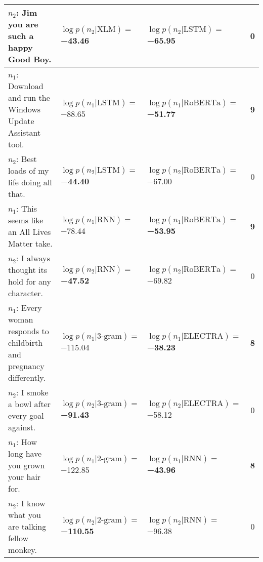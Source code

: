 \begin{tabularx}{\textwidth}{lllc}
                            $n_2$: Jim you are such a happy Good Boy. &      $\log p(n_2 | \textrm{XLM})=$\textbf{\num{-43.46}} &              $\log p(n_2 | \textrm{LSTM})=$\num{-65.95} &            \num{0} \\\midrule
           $n_1$: Download and run the Windows Update Assistant tool. &              $\log p(n_1 | \textrm{LSTM})=$\num{-88.65} &  $\log p(n_1 | \textrm{RoBERTa})=$\textbf{\num{-51.77}} &   \textbf{\num{9}} \\
                         $n_2$: Best loads of my life doing all that. &     $\log p(n_2 | \textrm{LSTM})=$\textbf{\num{-44.40}} &           $\log p(n_2 | \textrm{RoBERTa})=$\num{-67.00} &            \num{0} \\\midrule
                     $n_1$: This seems like an All Lives Matter take. &               $\log p(n_1 | \textrm{RNN})=$\num{-78.44} &  $\log p(n_1 | \textrm{RoBERTa})=$\textbf{\num{-53.95}} &   \textbf{\num{9}} \\
                  $n_2$: I always thought its hold for any character. &      $\log p(n_2 | \textrm{RNN})=$\textbf{\num{-47.52}} &           $\log p(n_2 | \textrm{RoBERTa})=$\num{-69.82} &            \num{0} \\\midrule
 $n_1$: Every woman responds to childbirth and pregnancy differently. &           $\log p(n_1 | \textrm{3-gram})=$\num{-115.04} &  $\log p(n_1 | \textrm{ELECTRA})=$\textbf{\num{-38.23}} &   \textbf{\num{8}} \\
                      $n_2$: I smoke a bowl after every goal against. &   $\log p(n_2 | \textrm{3-gram})=$\textbf{\num{-91.43}} &           $\log p(n_2 | \textrm{ELECTRA})=$\num{-58.12} &            \num{0} \\\midrule
                        $n_1$: How long have you grown your hair for. &           $\log p(n_1 | \textrm{2-gram})=$\num{-122.85} &      $\log p(n_1 | \textrm{RNN})=$\textbf{\num{-43.96}} &   \textbf{\num{8}} \\
                    $n_2$: I know what you are talking fellow monkey. &  $\log p(n_2 | \textrm{2-gram})=$\textbf{\num{-110.55}} &               $\log p(n_2 | \textrm{RNN})=$\num{-96.38} &            \num{0} \\
\bottomrule
\end{tabularx}
